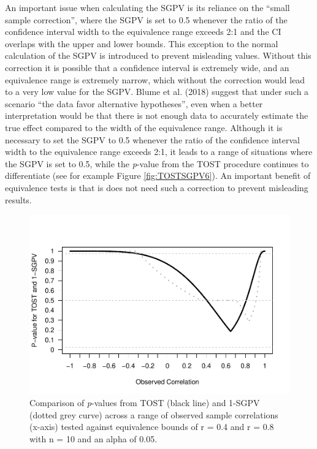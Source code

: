 \documentclass[,man,floatsintext]{apa6}
\begin{document}
An important issue when calculating the SGPV is its reliance on the \enquote{small sample correction}, where the SGPV is set to 0.5 whenever the ratio of the confidence interval width to the equivalence range exceeds 2:1 and the CI overlaps with the upper and lower bounds. This exception to the normal calculation of the SGPV is introduced to prevent misleading values. Without this correction it is possible that a confidence interval is extremely wide, and an equivalence range is extremely narrow, which without the correction would lead to a very low value for the SGPV. Blume et al. (2018) suggest that under such a scenario \enquote{the data favor alternative hypotheses}, even when a better interpretation would be that there is not enough data to accurately estimate the true effect compared to the width of the equivalence range. Although it is necessary to set the SGPV to 0.5 whenever the ratio of the confidence interval width to the equivalence range exceeds 2:1, it leads to a range of situations where the SGPV is set to 0.5, while the \emph{p}-value from the TOST procedure continues to differentiate (see for example Figure \ref{fig:TOSTSGPV6}). An important benefit of equivalence tests is that is does not need such a correction to prevent misleading results.

\begin{figure}
\centering
\includegraphics{manuscript_files/figure-latex/TOSTSGPV13-1.pdf}
\caption{\label{fig:TOSTSGPV13}Comparison of \emph{p}-values from TOST (black line) and 1-SGPV (dotted grey curve) across a range of observed sample correlations (x-axis) tested against equivalence bounds of r = 0.4 and r = 0.8 with n = 10 and an alpha of 0.05.}
\end{figure}
\end{document}
